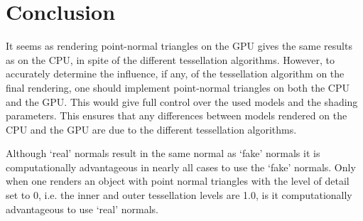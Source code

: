 
\section{Conclusion}
\label{s:conclusion}
	It seems as rendering point-normal triangles on the GPU gives the same results as on the CPU, in spite of the different tessellation algorithms. However, to accurately determine the influence, if any, of the tessellation algorithm on the final rendering, one should implement point-normal triangles on both the CPU and the GPU. This would give full control over the used models and the shading parameters. This ensures that any differences between models rendered on the CPU and the GPU are due to the different tessellation algorithms.

	Although `real' normals result in the same normal as `fake' normals it is computationally advantageous in nearly all cases to use the `fake' normals. Only when one renders an object with point normal triangles with the level of detail set to 0, i.e. the inner and outer tessellation levels are 1.0, is it computationally advantageous to use `real' normals.